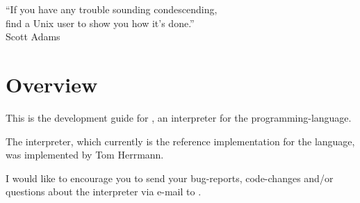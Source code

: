 


\globalDate{\today}
\globalKeywords{}







\begin{titlepage}
\maketitle

\vfill

\begin{center}
\Large
``If you have any trouble sounding condescending,\\
find a Unix user to show you how it's done.''\\
Scott Adams
\end{center}

\vfill
\end{titlepage}

\tableofcontents

\newpage

\section{Overview}

This is the development guide for \setlX, an interpreter for the \SetlX{} programming-language.

The \setlX{} interpreter, which currently is the reference implementation for the \SetlX{} language, was implemented by Tom Herrmann. 

I would like to encourage you to send your bug-reports, code-changes and\slash{}or questions about the \setlX{} interpreter via e-mail to .

